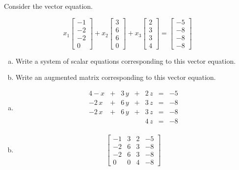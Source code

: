 
\begin{exerciseStatement}


Consider the vector equation.

\[ x_{1} \left[\begin{array}{c}
-1 \\
-2 \\
-2 \\
0
\end{array}\right] + x_{2} \left[\begin{array}{c}
3 \\
6 \\
6 \\
0
\end{array}\right] + x_{3} \left[\begin{array}{c}
2 \\
3 \\
3 \\
4
\end{array}\right] = \left[\begin{array}{c}
-5 \\
-8 \\
-8 \\
-8
\end{array}\right] \]
\begin{enumerate}[(a)]
\item  Write a system of scalar equations corresponding to this vector equation. 
\item  Write an augmented matrix corresponding to this vector equation. 
\end{enumerate}
    
\end{exerciseStatement}
    
\begin{exerciseAnswer} 

\begin{enumerate}[(a)]
\item 
\begin{alignat*}{4} -x &+& 3 \, y &+& 2 \, z &=& -5 \\-2 \, x &+& 6 \, y &+& 3 \, z &=& -8 \\-2 \, x &+& 6 \, y &+& 3 \, z &=& -8 \\ & &  & & 4 \, z &=& -8 \\ \end{alignat*}
            
\item \[ \left[\begin{array}{ccc|c}
-1 & 3 & 2 & -5 \\
-2 & 6 & 3 & -8 \\
-2 & 6 & 3 & -8 \\
0 & 0 & 4 & -8
\end{array}\right] \]
\end{enumerate}
    
\end{exerciseAnswer}
    
